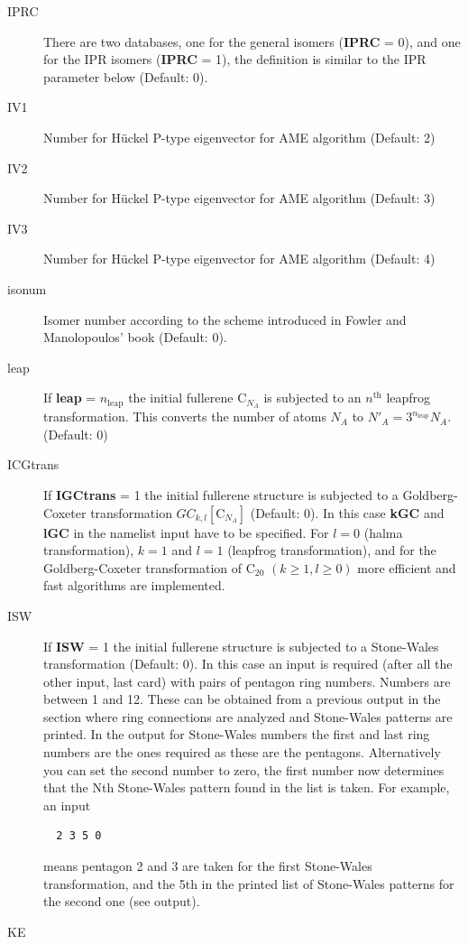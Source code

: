 \documentclass[article,a4paper,twoside]{memoir}
\newcommand{\C}[1]{\ensuremath{\mathrm{C}_{#1}}}
\newcommand{\paramname}[1]{{\color{green}\textbf{#1}}}
\begin{document}
\begin{description}
\item[{IPRC}]
There are two databases, one for the general isomers
(\paramname{IPRC} = 0), and one for the IPR isomers (\paramname{IPRC} = 1), the definition is similar to the IPR parameter below (Default: 0).
\item[{IV1}] Number for H\"uckel P-type eigenvector for AME algorithm (Default: 2)
\item[{IV2}] Number for H\"uckel P-type eigenvector for AME algorithm (Default: 3)
\item[{IV3}] Number for H\"uckel P-type eigenvector for AME algorithm (Default: 4)
\item[{isonum}] Isomer number according to the scheme introduced in Fowler and Manolopoulos' book \cite{Atlas} (Default: 0).
\item[{leap}] If \paramname{leap} = $n_\mathrm{leap}$ the initial fullerene C$_{N_A}$ is subjected to an $n^\mathrm{th}$ leapfrog transformation. 
This converts the number of atoms $N_A$ to $N'_A = 3^{n_\mathrm{leap}}N_A$. (Default: 0)
\item[{ICGtrans}] 
If \paramname{IGCtrans} = 1 the initial fullerene structure is subjected to a Goldberg-Coxeter transformation $GC_{k,l}[\C{N_A}]$ (Default: 0). In this case \paramname{kGC} and \paramname{lGC} in the namelist input have to be specified.
For $l=0$ (halma transformation), $k=1$ and $l=1$ (leapfrog transformation), and for the Goldberg-Coxeter transformation of \C{20} $(k\ge 1, l\ge 0)$ more efficient and fast algorithms are implemented. 
\item[ISW] 
  If \paramname{ISW} = 1 the initial fullerene structure is subjected
  to a Stone-Wales transformation (Default: 0). In this case an input
  is required (after all the other input, last card) with pairs of
  pentagon ring numbers. Numbers are between 1 and 12. These can be
  obtained from a previous output in the section where ring
  connections are analyzed and Stone-Wales patterns are printed. In
  the output for Stone-Wales numbers the first and last ring numbers
  are the ones required as these are the pentagons. Alternatively you
  can set the second number to zero, the first number now determines
  that the Nth Stone-Wales pattern found in the list is taken.  For
  example, an input
\begin{verbatim}
  2 3 5 0
\end{verbatim}
means pentagon 2 and 3 are taken for the first Stone-Wales transformation, and the 5th in the printed list of 
Stone-Wales patterns for the second one (see output).
\item[KE] 

\end{description}
\end{document}
